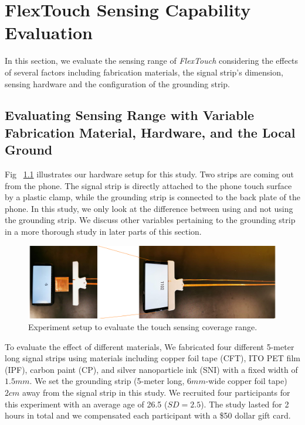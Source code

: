 \chapter{FlexTouch Sensing Capability Evaluation}
In this section, we evaluate the sensing range of \textit{FlexTouch} considering the effects of several factors including fabrication materials, the signal strip's dimension, sensing hardware and the configuration of the grounding strip.

\section{Evaluating Sensing Range with Variable Fabrication Material, Hardware, and the Local Ground}

Fig ~\ref{fig:experiment} illustrates our hardware setup for this study. Two strips are coming out from the phone. The signal strip is directly attached to the phone touch surface by a plastic clamp, while the grounding strip is connected to the back plate of the phone. In this study, we only look at the difference between using and not using the grounding strip. We discuss other variables pertaining to the  grounding strip in a more thorough study in later parts of this section. 

\begin{figure}[ht]
	\centering
	\includegraphics[width=0.70\columnwidth]{figures/evaluation_env.png}
	\setlength{\belowcaptionskip}{-6pt}
    \caption{Experiment setup to evaluate the touch sensing coverage range.}
    \label{fig:experiment}
\end{figure}
	
To evaluate the effect of different materials, We fabricated four different 5-meter long signal strips using materials including copper foil tape (CFT), ITO PET film (IPF), carbon paint (CP), and silver nanoparticle ink (SNI) with a fixed width of $1.5mm$. We set the grounding strip (5-meter long, $6mm$-wide copper foil tape) $2 cm$ away from the signal strip in this study. We recruited four participants for this experiment with an average age of 26.5 ($SD = 2.5$). The study lasted for 2 hours in total and we compensated each participant with a \$50 dollar gift card.

